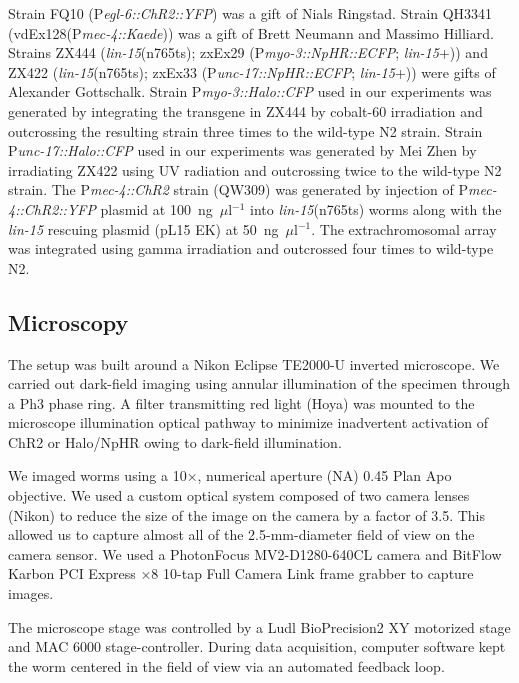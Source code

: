 Strain FQ10 (P\textit{egl-6::ChR2::YFP}) was a gift of Nials Ringstad. Strain QH3341 (vdEx128(P\textit{mec-4::Kaede})) was a gift of Brett Neu\-mann and Massimo Hill\-iard. Strains ZX444 (\textit{lin-15}(n765ts); zxEx29 (P\textit{myo-3::NpHR::ECFP}; \textit{lin-15}+)) and ZX422 (\textit{lin-15}(n765ts); zxEx33 (P\textit{unc-17::NpHR::ECFP}; \textit{lin-15}+)) were gifts of Alex\-ander Gotts\-chalk. Strain P\textit{myo-3::Halo::CFP} used in our experiments was generated by integrating the trans\-gene in ZX444 by cobalt-60 irradiation and outcrossing the resulting strain three times to the wild-type N2 strain. Strain P\textit{unc-17::Halo::CFP} used in our experiments was generated by Mei Zhen by irradiating ZX422 using UV radiation and outcrossing twice to the wild-type N2 strain. The P\textit{mec-4::ChR2} strain (QW309) was generated by injection of P\textit{mec-4::ChR2::YFP} plasmid at 100~ng~$\mu$l$^{-1}$ into \textit{lin-15}(n765ts) worms along with the \textit{lin-15} rescuing plasmid (pL15 EK) at 50~ng~$\mu$l$^{-1}$. The extrachromosomal array was integrated using gamma irradiation and outcrossed four times to wild-type N2.

\subsection{Microscopy}\label{colbert:microscopyMethods}
The setup was built around a Nikon Eclipse TE2000-U inverted microscope. We carried out dark-field imaging using annular illumination of the specimen through a Ph3 phase ring. A filter transmitting red light (Hoya) was mounted to the microscope illumination optical pathway to minimize inadvertent activation of ChR2 or Halo/NpHR owing to dark-field illumination.

We imaged worms using a 10×, numerical aperture (NA) 0.45 Plan Apo objective. We used a custom optical system composed of two camera lenses (Nikon) to reduce the size of the image on the camera by a factor of 3.5. This allowed us to capture almost all of the 2.5-mm-diameter field of view on the camera sensor. We used a PhotonFocus MV2-D1280-640CL camera and BitFlow Karbon PCI Express ×8 10-tap Full Camera Link frame grabber to capture images.

The microscope stage was controlled by a Ludl BioPrecision2 XY motorized stage and MAC 6000 stage-controller. During data acquisition, computer software kept the worm centered in the field of view via an automated feedback loop.

